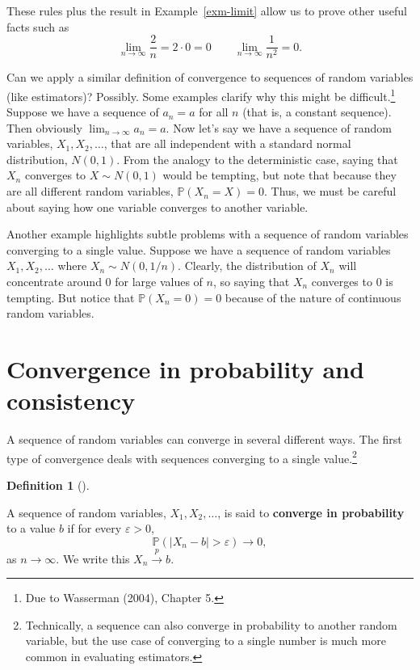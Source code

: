 \documentclass[
  13pt,
  letterpaper,
  DIV=11,
  numbers=noendperiod]{scrreprt}
\renewcommand{\P}{\mathbb{P}}
\newcommand{\inprob}{\overset{p}{\to}}
\theoremstyle{definition}
\newtheorem{definition}{Definition}[chapter]
\theoremstyle{definition}
\theoremstyle{plain}
\theoremstyle{remark}
\begin{document}
These rules plus the result in Example~\ref{exm-limit} allow us to prove
other useful facts such as \[
\lim_{n\to\infty} \frac{2}{n} = 2 \cdot 0 = 0 \qquad  \lim_{n\to\infty} \frac{1}{n^{2}} = 0.
\]

Can we apply a similar definition of convergence to sequences of random
variables (like estimators)? Possibly. Some examples clarify why this
might be difficult.\footnote{Due to Wasserman (2004), Chapter 5.}
Suppose we have a sequence of \(a_n = a\) for all \(n\) (that is, a
constant sequence). Then obviously
\(\lim_{n\rightarrow\infty} a_n = a\). Now let's say we have a sequence
of random variables, \(X_1, X_2, \ldots\), that are all independent with
a standard normal distribution, \(N(0,1)\). From the analogy to the
deterministic case, saying that \(X_n\) converges to \(X \sim N(0, 1)\)
would be tempting, but note that because they are all different random
variables, \(\P(X_n = X) = 0\). Thus, we must be careful about saying
how one variable converges to another variable.

Another example highlights subtle problems with a sequence of random
variables converging to a single value. Suppose we have a sequence of
random variables \(X_1, X_2, \ldots\) where \(X_n \sim N(0, 1/n)\).
Clearly, the distribution of \(X_n\) will concentrate around 0 for large
values of \(n\), so saying that \(X_n\) converges to 0 is tempting. But
notice that \(\P(X_n = 0) = 0\) because of the nature of continuous
random variables.

\section{Convergence in probability and
consistency}\label{convergence-in-probability-and-consistency}

A sequence of random variables can converge in several different ways.
The first type of convergence deals with sequences converging to a
single value.\footnote{Technically, a sequence can also converge in
  probability to another random variable, but the use case of converging
  to a single number is much more common in evaluating estimators.}

\begin{definition}[]\protect\hypertarget{def-inprob}{}\label{def-inprob}

A sequence of random variables, \(X_1, X_2, \ldots\), is said to
\textbf{converge in probability} to a value \(b\) if for every
\(\varepsilon > 0\), \[
\P(|X_n - b| > \varepsilon) \rightarrow 0,
\] as \(n\rightarrow \infty\). We write this \(X_n \inprob b\).

\end{definition}
\end{document}

